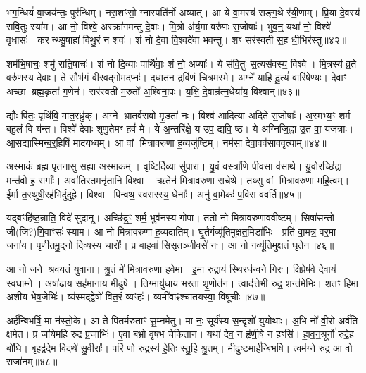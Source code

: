भग॒न्धियं॑ वा॒जय॑न्तः॒ पुर॑न्धिम्।
नरा॒शꣳसो॒ ग्नास्पति॑र्नो अव्यात्।
आ ये वा॒मस्य॑ सङ्ग॒थे र॑यी॒णाम्।
प्रि॒या दे॒वस्य॑ सवि॒तुः स्या॑म।
आ नो॒ विश्वे॒ अस्क्रा॑गमन्तु दे॒वाः।
मि॒त्रो अ॑र्य॒मा वरु॑णः स॒जोषाः᳚।
भुव॒न्॒ यथा॑ नो॒ विश्वे॑ वृ॒धासः॑।
करन्थ्सु॒षाहा॑ विथु॒रं न शवः॑।
शं नो॑ दे॒वा वि॒श्वदे॑वा भवन्तु।
शꣳ सर॑स्वती स॒ह धी॒भिर॑स्तु॥४२॥

शम॑भि॒षाचः॒ शमु॑ राति॒षाचः॑।
शं नो॑ दि॒व्याः पार्थि॑वाः॒ शं नो॒ अप्याः᳚।
ये स॑वि॒तुः स॒त्यस॑वस्य॒ विश्वे।
मि॒त्रस्य॑ व्र॒ते वरु॑णस्य दे॒वाः।
ते सौभ॑गं वी॒रव॒द्गोम॒दप्नः॑।
दधा॑तन॒ द्रवि॑णं चि॒त्रम॒स्मे।
अग्ने॑ या॒हि दू॒त्यं॑ वारि॑षेण्यः।
दे॒वाꣳ अच्छा ब्रह्म॒कृता॑ ग॒णेन॑।
सर॑स्वतीं म॒रुतो॑ अ॒श्विना॒पः।
य॒क्षि॒ दे॒वान्र॑त्न॒धेया॑य॒ विश्वान्॑॥४३॥

द्यौः पि॑तः॒ पृथि॑वि॒ मात॒रध्रु॑क्।
अग्ने भ्रातर्वसवो मृ॒डता॑ नः।
विश्व॑ आदित्या अदिते स॒जोषाः᳚।
अ॒स्मभ्य॒ꣳ॒ शर्म॑ बहु॒लं वि य॑न्त।
विश्वे॑ देवाः शृणु॒तेमꣳ हवं॑ मे।
ये अ॒न्तरि॑क्षे॒ य उप॒ द्यवि॒ ष्ठ।
ये अ॑ग्निजि॒ह्वा उ॒त वा॒ यज॑त्राः।
आ॒सद्या॒स्मिन्ब॒र्॒हिषि॑ मादयध्वम्।
आ वां मित्रावरुणा ह॒व्यजु॑ष्टिम्।
नम॑सा देवा॒वव॑साववृत्याम्॥४४॥

अ॒स्माकं॒ ब्रह्म॒ पृत॑नासु सह्या अ॒स्माकम्।
वृ॒ष्टिर्दि॒व्या सु॑पा॒रा।
यु॒वं वस्त्रा॑णि पीव॒सा व॑साथे।
यु॒वोरच्छि॑द्रा॒ मन्त॑वो ह॒ सर्गाः᳚।
अवा॑तिरत॒मनृ॑तानि॒ विश्वा।
ऋ॒तेन॑ मित्रावरुणा सचेथे।
तथ्सु वां मित्रावरुणा महि॒त्वम्।
ई॒र्मा त॒स्थुषी॒रह॑भिर्दुदुह्रे।
विश्वा पिन्वथ॒ स्वस॑रस्य॒ धेनाः᳚।
अनु॑ वा॒मेकः॑ प॒विरा व॑वर्ति॥४५॥

यद्बꣳहि॑ष्ठ॒न्नाति॒ विदे॑ सुदानू।
अच्छि॑द्र॒ꣳ॒ शर्म॒ भुव॑नस्य गोपा।
ततो॑ नो मित्रावरुणाववीष्टम्।
सिषा॑सन्तो जी(जि?)गि॒वाꣳसः॑ स्याम।
आ नो मित्रावरुणा ह॒व्यदा॑तिम्।
घृ॒तैर्गव्यू॑तिमुक्षत॒मिडा॑भिः।
प्रति॑ वा॒मत्र॒ वर॒मा जना॑य।
पृ॒णी॒तमु॒द्नो दि॒व्यस्य॒ चारोः᳚।
प्र बा॒हवा॑ सिसृतञ्जी॒वसे॑ नः।
आ नो॒ गव्यू॑तिमुक्षतं घृ॒तेन॑॥४६॥

आ नो॒ जने श्रवयतं युवाना।
श्रु॒तं मे॑ मित्रावरुणा॒ हवे॒मा।
इ॒मा रु॒द्राय॑ स्थि॒रध॑न्वने॒ गिरः॑।
क्षि॒प्रेष॑वे दे॒वाय॑ स्व॒धाम्ने।
अषा॑ढाय॒ सह॑मानाय मी॒ढुषे।
ति॒ग्मायु॑धाय भरता शृ॒णोत॑न।
त्वाद॑त्तेभी रुद्र॒ शन्त॑मेभिः।
श॒तꣳ हिमा॑ अशीय भेष॒जेभिः॑।
व्य॑स्मद्द्वेषो॑ वित॒रं व्यꣳहः॑।
व्यमी॑वाꣴश्चातयस्वा॒ विषू॑चीः॥४७॥

अर्\mbox{}ह॑न्बिभर्\mbox{}षि॒ मा न॑स्तो॒के।
आ ते॑ पितर्मरुताꣳ सु॒म्नमे॑तु।
मा नः॒ सूर्य॑स्य स॒न्दृशो॑ युयोथाः।
अ॒भि नो॑ वी॒रो अर्व॑ति क्षमेत।
प्र जा॑येमहि रुद्र प्र॒जाभिः॑।
ए॒वा ब॑भ्रो वृषभ चेकितान।
यथा॑ देव॒ न हृ॑णी॒षे न हꣳसि॑।
हा॒व॒न॒श्रूर्नो॑ रुद्रे॒ह बो॑धि।
बृ॒हद्व॑देम वि॒दथे॑ सु॒वीराः᳚।
परि॑ णो रु॒द्रस्य॑ हे॒तिः स्तु॒हि श्रु॒तम्।
मीढु॑ष्ट॒मार्\mbox{}ह॑न्बिभर्\mbox{}षि।
त्वम॑ग्ने रु॒द्र आ वो॒ राजा॑नम्॥४८॥\anuvakamend[वसू॑नि ततानास्तु॒ विश्वान्॑ ववृत्यां ववर्ति घृ॒तेन॒ विषू॑चीः श्रु॒तन्द्वे च॑]

